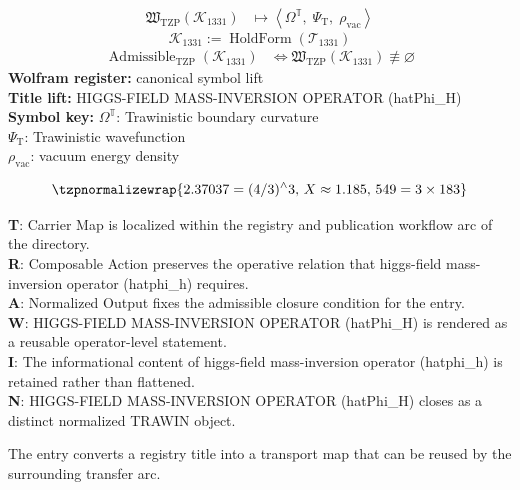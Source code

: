 \noindent
\begin{minipage}[t]{0.48\linewidth}
\begingroup
\small
\[
\begin{aligned}
\mathfrak{W}_{\mathrm{TZP}}\!\left(\mathcal{K}_{1331}\right)
&\longmapsto
\left\langle \Omega^{\mathbb{T}},\; \Psi_{\mathrm{T}},\; \rho_{\mathrm{vac}} \right\rangle
\end{aligned}
\]
\[
\mathcal{K}_{1331}
:=
\operatorname{HoldForm}\!\left(\mathcal{T}_{1331}\right)
\]
\[
\begin{aligned}
\operatorname{Admissible}_{\mathrm{TZP}}\!\left(\mathcal{K}_{1331}\right)
&\Longleftrightarrow
\mathfrak{W}_{\mathrm{TZP}}\!\left(\mathcal{K}_{1331}\right)\not\equiv\varnothing
\end{aligned}
\]
\textbf{Wolfram register:} canonical symbol lift\\
\textbf{Title lift:} HIGGS-FIELD MASS-INVERSION OPERATOR (hatPhi\_H)\\
\textbf{Symbol key:} \(\Omega^{\mathbb{T}}\): Trawinistic boundary curvature\\ \(\Psi_{\mathrm{T}}\): Trawinistic wavefunction\\ \(\rho_{\mathrm{vac}}\): vacuum energy density
\par
\endgroup
\end{minipage}\hfill
\begin{minipage}[t]{0.48\linewidth}
\[
\tzpnormalizewrap{2.37037=(4/3)^{\wedge}3,\,X\approx1.185,\,549=3\times183}
\]

\small
\textbf{T}: Carrier Map is localized within the registry and publication workflow arc of the directory.\\
\textbf{R}: Composable Action preserves the operative relation that higgs-field mass-inversion operator (hatphi\_h) requires.\\
\textbf{A}: Normalized Output fixes the admissible closure condition for the entry.\\
\textbf{W}: HIGGS-FIELD MASS-INVERSION OPERATOR (hatPhi\_H) is rendered as a reusable operator-level statement.\\
\textbf{I}: The informational content of higgs-field mass-inversion operator (hatphi\_h) is retained rather than flattened.\\
\textbf{N}: HIGGS-FIELD MASS-INVERSION OPERATOR (hatPhi\_H) closes as a distinct normalized TRAWIN object.
\normalsize
\end{minipage}

The entry converts a registry title into a transport map that can be reused by the surrounding transfer arc.
\clearpage

